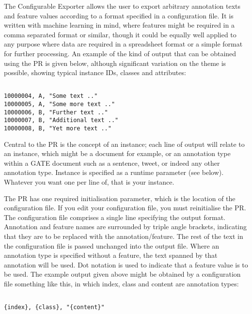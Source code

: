 
The Configurable Exporter allows the user to export arbitrary
annotation texts and feature values according to a format specified in
a configuration file. It is written with machine learning in mind,
where features might be required in a comma separated format or
similar, though it could be equally well applied to any purpose where
data are required in a spreadsheet format or a simple format for
further processing. An example of the kind of output that can be
obtained using the PR is given below, although significant variation
on the theme is possible, showing typical instance IDs, classes and
attributes:

\begin{verbatim}

10000004, A, "Some text .."
10000005, A, "Some more text .."
10000006, B, "Further text .."
10000007, B, "Additional text .."
10000008, B, "Yet more text .."

\end{verbatim}

Central to the PR is the concept of an instance; each line of output
will relate to an instance, which might be a document for example, or
an annotation type within a GATE document such as a sentence, tweet,
or indeed any other annotation type. Instance is specified as a
runtime parameter (see below). Whatever you want one per line of, that
is your instance.

The PR has one required initialisation parameter, which is the
location of the configuration file. If you edit your configuration
file, you must reinitialise the PR. The configuration file comprises a
single line specifying the output format. Annotation and feature names
are surrounded by triple angle brackets, indicating that they are to
be replaced with the annotation/feature. The rest of the text in the
configuration file is passed unchanged into the output file. Where an
annotation type is specified without a feature, the text spanned by
that annotation will be used. Dot notation is used to indicate that a
feature value is to be used. The example output given above might be
obtained by a configuration file something like this, in which index,
class and content are annotation types:

\begin{verbatim}

{index}, {class}, "{content}"

\end{verbatim}

